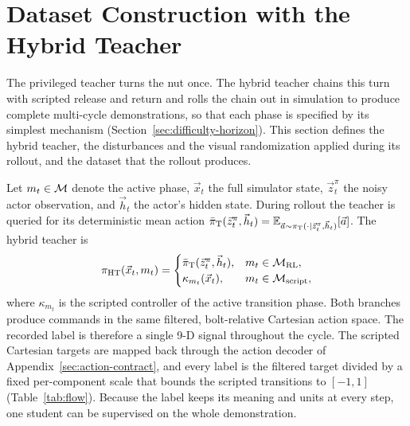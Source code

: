\section{Dataset Construction with the Hybrid Teacher}\label{sec:hybrid}

The privileged teacher turns the nut once. The hybrid teacher chains this turn with scripted release and return and rolls the chain out in simulation to produce complete multi-cycle demonstrations, so that each phase is specified by its simplest mechanism (Section~\ref{sec:difficulty-horizon}). This section defines the hybrid teacher, the disturbances and the visual randomization applied during its rollout, and the dataset that the rollout produces.

Let $m_t\in\mathcal{M}$ denote the active phase, $\vec{x}_t$ the full simulator state, $\vec{z}^{\pi}_t$ the noisy actor observation, and $\vec{h}_t$ the actor's hidden state. During rollout the teacher is queried for its deterministic mean action $\bar{\pi}_{\mathrm{T}}(\vec{z}^{\pi}_t,\vec{h}_t)=\mathbb{E}_{\vec{a}\sim\pi_{\mathrm{T}}(\cdot\mid\vec{z}^{\pi}_t,\vec{h}_t)}[\vec{a}]$. The hybrid teacher is
\begin{equation}\label{eq:hybrid}
  \pi_{\mathrm{HT}}(\vec{x}_t,m_t)=
  \begin{cases}
    \bar{\pi}_{\mathrm{T}}(\vec{z}^{\pi}_t,\vec{h}_t), & m_t\in\mathcal{M}_{\mathrm{RL}},\\
    \kappa_{m_t}(\vec{x}_t), & m_t\in\mathcal{M}_{\mathrm{script}},
  \end{cases}
\end{equation}
where $\kappa_{m_t}$ is the scripted controller of the active transition phase. Both branches produce commands in the same filtered, bolt-relative Cartesian action space. The recorded label is therefore a single 9-D signal throughout the cycle. The scripted Cartesian targets are mapped back through the action decoder of Appendix~\ref{sec:action-contract}, and every label is the filtered target divided by a fixed per-component scale that bounds the scripted transitions to $[-1,1]$ (Table~\ref{tab:flow}). Because the label keeps its meaning and units at every step, one student can be supervised on the whole demonstration.

